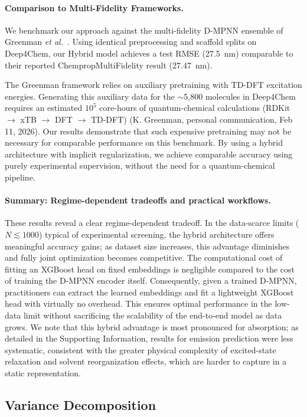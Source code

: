 \paragraph{Comparison to Multi-Fidelity Frameworks.}
We benchmark our approach against the multi-fidelity D-MPNN ensemble of Greenman \textit{et al.}~\cite{greenman2022multi}. Using identical preprocessing and scaffold splits on Deep4Chem, our Hybrid model achieves a test RMSE (27.5~nm) comparable to their reported ChempropMultiFidelity result (27.47~nm).

The Greenman framework relies on auxiliary pretraining with TD-DFT excitation energies. Generating this auxiliary data for the $\sim$5,800 molecules in Deep4Chem requires an estimated $10^5$ core-hours of quantum-chemical calculations (RDKit $\rightarrow$ xTB $\rightarrow$ DFT $\rightarrow$ TD-DFT) (K. Greenman, personal communication, Feb 11, 2026). Our results demonstrate that such expensive pretraining may not be necessary for comparable performance on this benchmark. By using a hybrid architecture with implicit regularization, we achieve comparable accuracy using purely experimental supervision, without the need for a quantum-chemical pipeline.

\paragraph{Summary: Regime-dependent tradeoffs and practical workflows.}
These results reveal a clear regime-dependent tradeoff. In the data-scarce limits ($N \lesssim 1000$) typical of experimental screening, the hybrid architecture offers meaningful accuracy gains; as dataset size increases, this advantage diminishes and fully joint optimization becomes competitive.
The computational cost of fitting an XGBoost head on fixed embeddings is negligible compared to the cost of training the D-MPNN encoder itself. Consequently, given a trained D-MPNN, practitioners can extract the learned embeddings and fit a lightweight XGBoost head with virtually no overhead. This ensures optimal performance in the low-data limit without sacrificing the scalability of the end-to-end model as data grows.
We note that this hybrid advantage is most pronounced for absorption; as detailed in the Supporting Information, results for emission prediction were less systematic, consistent with the greater physical complexity of excited-state relaxation and solvent reorganization effects, which are harder to capture in a static representation.

\subsection{Variance Decomposition}

